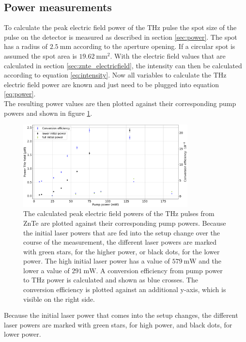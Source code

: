 \subsection{Power measurements}
\FloatBarrier
To calculate the peak electric field power of the $\si{\tera\hertz}$ pulse the spot size of the pulse on the detector is measured as described in section \ref{sec:power}.
The spot has a radius of $\SI{2.5}{\milli\meter}$ according to the aperture opening.
If a circular spot is assumed the spot area is $\SI{19.62}{\milli\meter\squared}$.
With the electric field values that are calculated in section \ref{sec:znte_electricfield}, the intensity can then be calculated according to equation \eqref{eq:intensity}.
Now all variables to calculate the $\si{\tera\hertz}$ electric field power are known and just need to be plugged into equation \eqref{eq:power}.
\\
The resulting power values are then plotted against their corresponding pump powers and shown in figure \ref{fig:znte_power}.\FloatBarrier
\begin{figure}
    \centering
    \includegraphics[width=0.8\textwidth]{Plots/Powerznte.pdf}
    \caption{The calculated peak electric field powers of the $\si{\tera\hertz}$ pulses from ZnTe are plotted against their corresponding pump powers.
    Because the initial laser powers that are fed into the setup change over the course of the measurement, the different laser powers are marked with green stars, for the higher power, or black dots, for the lower power.
    The high initial laser power has a value of $\SI{579}{\milli\W}$ and the lower a value of $\SI{291}{\milli\W}$.
    A conversion efficiency from pump power to $\si{\tera\hertz}$ power is calculated and shown as blue crosses. 
    The conversion efficiency is plotted against an additional y-axis, which is visible on the right side.}
    \label{fig:znte_power}
\end{figure}\FloatBarrier
Because the initial laser power that comes into the setup changes, the different laser powers are marked with green stars, for high power, and black dots, for lower power.
